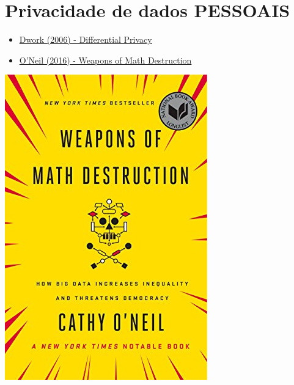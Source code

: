 \documentclass{beamer}\usepackage[]{graphicx}\usepackage[]{xcolor}
\begin{document}
\section{Privacidade de dados PESSOAIS}
\begin{frame}{\secname}
  \begin{itemize}
    \item \href{http://www.dbis.informatik.hu-berlin.de/fileadmin/lectures/SS2011/VL_Privacy/Differential_Privacy.pdf}{Dwork (2006) - Differential Privacy}
    \pause
    \item \href{https://books.google.com.br/books/about/Weapons_of_Math_Destruction.html?id=CxD-DAAAQBAJ&redir_esc=y}{O'Neil (2016) - Weapons of Math Destruction}
	\end{itemize}
	\begin{center}
  \includegraphics[scale=0.3]{weapons.jpg}
  \end{center}
\end{frame}
\end{document}
